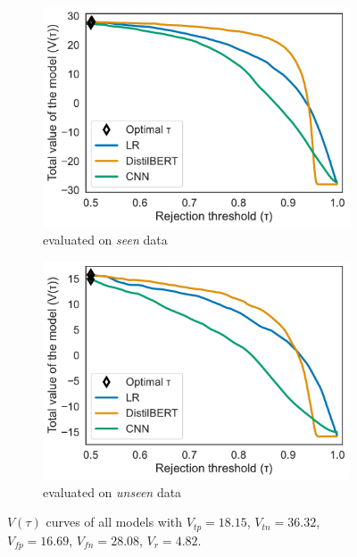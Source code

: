 \begin{figure}[t]
    \centering
    \begin{subfigure}{.49\textwidth}
        \includegraphics[scale=.4]{Figures/metric-all-values-seen-data.pdf}
        \caption{evaluated on \emph{seen} data}
    \end{subfigure}
    \begin{subfigure}{.49\textwidth}
        \includegraphics[scale=.4]{Figures/metric-all-values-unseen-data.pdf}
        \caption{evaluated on \emph{unseen} data}
    \end{subfigure}
    \caption{$V(\tau)$ curves of all models with $V_{tp} = 18.15$, $V_{tn} = 36.32$, $V_{fp} = 16.69$, $V_{fn} = 28.08$, $V_r = 4.82$.}
    \label{fig:metric-plots-all-values}
\end{figure}

